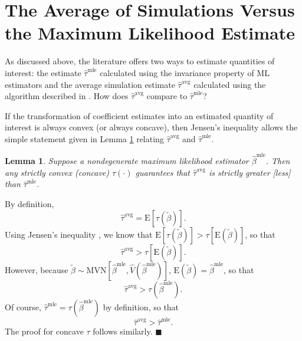 \documentclass[11pt]{article}
\newtheorem{lemma}{Lemma}
\newenvironment{proof}[1][Proof]{\begin{trivlist}
\item[\hskip \labelsep {\bfseries #1}]}{\end{trivlist}}
\begin{document}
\section*{The Average of Simulations Versus the Maximum Likelihood Estimate}

As discussed above, the literature offers two ways to estimate quantities of interest: the estimate $\hat{\tau}^\text{mle}$ calculated using the invariance property of ML estimators and the average simulation estimate $\hat{\tau}^\text{avg}$ calculated using the algorithm described in \cite{KingTomzWittenberg2000}. How does $\hat{\tau}^\text{avg}$ compare to $\hat{\tau}^{\text{mle}}$? %



If the transformation of coefficient estimates into an estimated quantity of interest is always convex (or always concave), then Jensen's inequality allows the simple statement given in Lemma \ref{lem:direction} relating $\hat{\tau}^\text{avg}$ and $\hat{\tau}^{\text{mle}}$.

\begin{lemma}\label{lem:direction}
Suppose a nondegenerate maximum likelihood estimator $\hat{\beta}^\text{mle}$.
Then any strictly convex (concave) $\tau(\cdot)$ guarantees that $\hat{\tau}^{\text{avg}}$ is strictly greater [less] than $\hat{\tau}^\text{mle}$.
\end{lemma}
\begin{proof}
By definition, $$ \hat{\tau}^{\text{avg}} = \text{E}\left[ \tau \left(\tilde{\beta} \right) \right].$$
Using Jensen's inequality \citep[p.\@ 190, Thm.\@ 4.7.7]{CasellaBerger2002}, we know that $\text{E}\left[ \tau \left(\tilde{\beta} \right) \right] > \tau \left[ \text{E}\left( \tilde{\beta} \right) \right]$, so that $$\hat{\tau}^{\text{avg}} > \tau \left[ \text{E}\left( \tilde{\beta} \right) \right].$$
However, because $\tilde{\beta} \sim \text{MVN} \left[ \hat{\beta}^{\text{mle}}, \hat{V} \left( \hat{\beta}^{\text{mle}} \right) \right]$, $\text{E}\left( \tilde{\beta} \right) = \hat{\beta}^\text{mle}$, so that
$$\hat{\tau}^{\text{avg}} > \tau \left( \hat{\beta}^\text{mle}\right).$$
Of course, $\hat{\tau}^\text{mle} = \tau \left( {\hat{\beta}^\text{mle}} \right)$ by definition, so that $$\hat{\tau}^{\text{avg}} > \hat{\tau}^\text{mle}.$$
The proof for concave $\tau$ follows similarly.
 $\blacksquare$
\end{proof}
\end{document}

